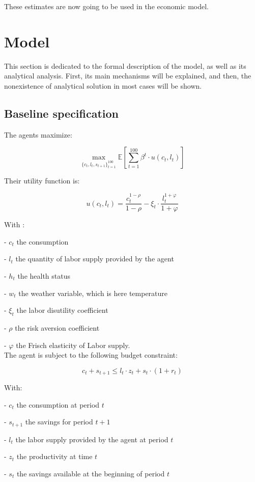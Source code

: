\documentclass{article}
\begin{document}
These estimates are now going to be used in 
the economic model.

\section{Model}

This section is dedicated to the formal description of 
the model, as well as its analytical analysis.
First, its main mechanisms will be explained, and then, the 
nonexistence of analytical solution in most cases will be shown.

\subsection{Baseline specification }

The agents maximize: 

$$ \max_{\{c_{t},l_{t},s_{t+1}\}_{t=1}^{100}}{\mathbb{E}\left[\sum_{t=1}^{100} \beta^{t}\cdot u(c_t,l_t)\right]}$$

Their utility function is: 

$$u(c_{t},l_{t}) = \frac{c_{t}^{1-\rho}}{1-\rho}-\xi_{t}\cdot \frac{l_{t}^{1+\varphi}}{1+\varphi}$$

With : 

-  $c_{t}$  the consumption

-  $l_{t}$  the quantity of labor supply provided by the agent

-  $h_{t}$  the health status

-  $w_{t}$  the weather variable, which is here temperature

-  $\xi_{t}$ the labor disutility coefficient

- $\rho$ the risk aversion coefficient

- $\varphi$ the Frisch elasticity of Labor supply.
\\

The agent is subject to the following budget constraint:

$$c_{t} + s_{t+1} \leq l_{t}\cdot z_{t} + s_{t}\cdot(1+r_{t})$$

With: 

-  $c_t$ the consumption at period $t$

-  $s_{t+1}$ the savings for period $t+1$

-  $l_t$ the labor supply provided by the agent at period $t$

-  $z_t$ the productivity at time $t$

-  $s_{t}$ the savings available at the beginning of period $t$
\end{document}
